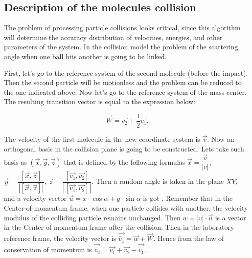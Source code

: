 \documentclass[12pt,twoside]{article}
\begin{document}
    \subsection{Description of the molecules collision}

    \indent The problem of processing particle collisions looks critical, since this algorithm will
     determine the accuracy distribution of velocities, energies, and other parameters of the system.
    In the collision model the problem of the scattering angle when one ball hits another is going to be linked.

    First, let's go to the reference system of the second molecule (before the impact). 
    Then the second particle will be motionless and the problem can be reduced to the one indicated above.
    Now let's go to the reference system of the mass center. The resulting transition vector is equal to the expression below:

    \begin{equation}
        \overrightarrow{W} = \overrightarrow{v_2} + \dfrac{1}{2}\overrightarrow{v_1}.
    \end{equation}

    \indent The velocity of the first molecule in the new coordinate system is $\overrightarrow{v}$.
    Now an orthogonal basis in the collision plane is going to be constructed. 
    Lets take such basis as $(\overrightarrow{x}, \overrightarrow{y}, \overrightarrow{z})$ that is defined by the following formulas 
    $\overrightarrow{x} = \dfrac{\overrightarrow{v}}{|v|}$,  
    $\overrightarrow{y} = \dfrac{[\overrightarrow{x}, \overrightarrow{z}]}{|[\overrightarrow{x}, \overrightarrow{z}]|}$,
    $\overrightarrow{z} = \dfrac{[\overrightarrow{v_1}, \overrightarrow{v_2}]}{|[\overrightarrow{v_1}, \overrightarrow{v_2}]|}$.
    Then a random angle is taken in the plane $X Y$, 
    and a velocity vector $\overrightarrow{u} = x \cdot \cos \alpha + y \cdot \sin \alpha$ is got .
    Remember that in the Center-of-momentum frame, when one particle collides with another, 
    the velocity modulus of the colliding particle remains unchanged. Then $w = |v| \cdot \overrightarrow{u}$ is a vector in the Center-of-momentum frame after the collision.
    Then in the laboratory reference frame, the velocity vector is $\overrightarrow{\tilde{v_1}} = \overrightarrow{w} + \overrightarrow{W}$.
    Hence from the law of conservation of momentum is $\overrightarrow{\tilde{v_2}} = \overrightarrow{v_1} + \overrightarrow{v_2} - \overrightarrow{\tilde{v_1}}$.
\end{document}
